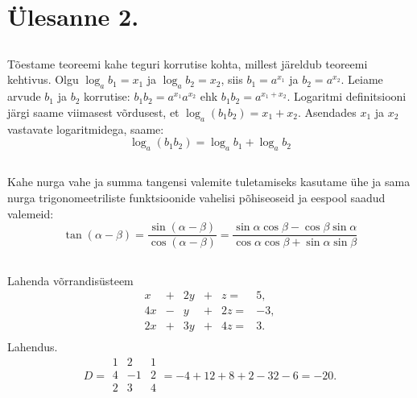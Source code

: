 \section{Ülesanne 2.}

\subsection*{}

Tõestame teoreemi kahe teguri korrutise kohta, millest järeldub teoreemi kehtivus.
Olgu $\log_a b_1 = x_1$ ja $\log_a b_2 = x_2$, siis $b_1 = a^{x_1}$ ja $b_2 = a^{x_2}$. Leiame arvude $b_1$ ja $b_2$ korrutise: $b_1 b_2 = a^{x_1} a^{x_2}$ ehk $b_1 b_2 = a^{x_1 + x_2}$. Logaritmi definitsiooni järgi saame viimasest võrdusest, et $\log_a(b_1 b_2) = x_1 + x_2$. Asendades $x_1$ ja $x_2$ vastavate logaritmidega, saame:
\begin{displaymath}
	\log_a(b_1 b_2) = \log_a b_1 + \log_a b_2
\end{displaymath}

\subsection*{}

Kahe nurga vahe ja summa tangensi valemite tuletamiseks kasutame ühe ja sama nurga trigonomeetriliste funktsioonide vahelisi põhiseoseid ja eespool saadud valemeid:
\begin{displaymath}
	\tan(\alpha	- \beta)
		= \frac{\sin(\alpha	- \beta)}{\cos(\alpha	- \beta)}
		= \frac{\sin\alpha\cos\beta - \cos\beta\sin\alpha}
					 {\cos\alpha\cos\beta + \sin\alpha\sin\beta}
\end{displaymath}

\subsection*{}

Lahenda võrrandisüsteem
\begin{displaymath}
  \begin{array}{*{7}{r}}
    x  & + & 2y & + &  z = &  5, \\
    4x & - &  y & + & 2z = & -3, \\
    2x & + & 3y & + & 4z = &  3. \\
  \end{array}
\end{displaymath}
Lahendus.
\begin{displaymath}
	D = 
	\begin{array}{|*{3}{r}|}
	1 & 2 & 1 \\
	4 & -1 & 2 \\
	2 & 3 & 4 \\
	\end{array}
	= -4 +12 +8 +2 -32 -6 = -20.
\end{displaymath}
